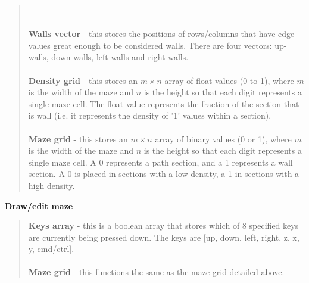 \documentclass[titlepage]{article}
\begin{document}
\begin{quote}
\\\\
\textbf{Walls vector} - this stores the positions of rows/columns that have edge values great enough to be considered walls. There are four vectors: up-walls, down-walls, left-walls and right-walls.
\\\\
\textbf{Density grid} - this stores an $m \times n$ array of float values (0 to 1), where $m$ is the width of the maze and $n$ is the height so that each digit represents a single maze cell. The float value represents the fraction of the section that is wall (i.e. it represents the density of '1' values within a section).
\\\\
\textbf{Maze grid} - this stores an $m \times n$ array of binary values (0 or 1), where $m$ is the width of the maze and $n$ is the height so that each digit represents a single maze cell. A 0 represents a path section, and a 1 represents a wall section. A 0 is placed in sections with a low density, a 1 in sections with a high density.
\end{quote}

\textbf{Draw/edit maze}
\begin{quote}
\textbf{Keys array} - this is a boolean array that stores which of 8 specified keys are currently being pressed down. The keys are [up, down, left, right, z, x, y, cmd/ctrl].
\\\\
\textbf{Maze grid} - this functions the same as the maze grid detailed above.
\end{quote}
\end{document}
